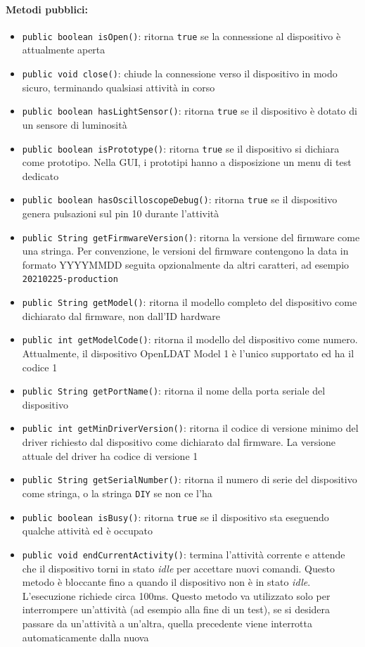 \paragraph{Metodi pubblici:}\begin{itemize}
	\item \texttt{public boolean isOpen()}: ritorna \texttt{true} se la connessione al dispositivo è attualmente aperta
	\item \texttt{public void close()}: chiude la connessione verso il dispositivo in modo sicuro, terminando qualsiasi attività in corso
	\item \texttt{public boolean hasLightSensor()}: ritorna \texttt{true} se il dispositivo è dotato di un sensore di luminosità
	\item \texttt{public boolean isPrototype()}: ritorna \texttt{true} se il dispositivo si dichiara come prototipo. Nella GUI, i prototipi hanno a disposizione un menu di test dedicato
	\item \texttt{public boolean hasOscilloscopeDebug()}: ritorna \texttt{true} se il dispositivo genera pulsazioni sul pin 10 durante l'attività
	\item \texttt{public String getFirmwareVersion()}: ritorna la versione del firmware come una stringa. Per convenzione, le versioni del firmware contengono la data in formato YYYYMMDD seguita opzionalmente da altri caratteri, ad esempio \texttt{20210225-production}
	\item \texttt{public String getModel()}: ritorna il modello completo del dispositivo come dichiarato dal firmware, non dall'ID hardware
	\item \texttt{public int getModelCode()}: ritorna il modello del dispositivo come numero. Attualmente, il dispositivo OpenLDAT Model 1 è l'unico supportato ed ha il codice 1
	\item \texttt{public String getPortName()}: ritorna il nome della porta seriale del dispositivo
	\item \texttt{public int getMinDriverVersion()}: ritorna il codice di versione minimo del driver richiesto dal dispositivo come dichiarato dal firmware. La versione attuale del driver ha codice di versione 1
	\item \texttt{public String getSerialNumber()}: ritorna il numero di serie del dispositivo come stringa, o la stringa \texttt{DIY} se non ce l'ha
	\item \texttt{public boolean isBusy()}: ritorna \texttt{true} se il dispositivo sta eseguendo qualche attività ed è occupato
	\item \texttt{public void endCurrentActivity()}: termina l'attività corrente e attende che il dispositivo torni in stato \textit{idle} per accettare nuovi comandi. Questo metodo è bloccante fino a quando il dispositivo non è in stato \textit{idle}. L'esecuzione richiede circa 100ms. Questo metodo va utilizzato solo per interrompere un'attività (ad esempio alla fine di un test), se si desidera passare da un'attività a un'altra, quella precedente viene interrotta automaticamente dalla nuova

\end{itemize}
